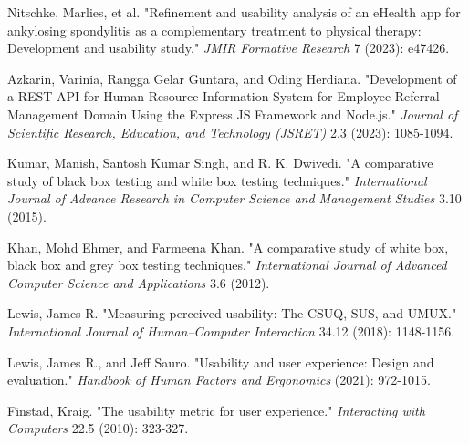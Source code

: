 \documentclass[conference,a4paper]{IEEEtran}
\begin{document}
\begin{thebibliography}{00}
   Nitschke, Marlies, et al. "Refinement and usability analysis of an eHealth app for ankylosing spondylitis as a complementary treatment to physical therapy: Development and usability study." \textit{JMIR Formative Research} 7 (2023): e47426.

   Azkarin, Varinia, Rangga Gelar Guntara, and Oding Herdiana. "Development of a REST API for Human Resource Information System for Employee Referral Management Domain Using the Express JS Framework and Node.js." \textit{Journal of Scientific Research, Education, and Technology (JSRET)} 2.3 (2023): 1085-1094.

   Kumar, Manish, Santosh Kumar Singh, and R. K. Dwivedi. "A comparative study of black box testing and white box testing techniques." \textit{International Journal of Advance Research in Computer Science and Management Studies} 3.10 (2015).

   Khan, Mohd Ehmer, and Farmeena Khan. "A comparative study of white box, black box and grey box testing techniques." \textit{International Journal of Advanced Computer Science and Applications} 3.6 (2012).

   Lewis, James R. "Measuring perceived usability: The CSUQ, SUS, and UMUX." \textit{International Journal of Human–Computer Interaction} 34.12 (2018): 1148-1156.

   Lewis, James R., and Jeff Sauro. "Usability and user experience: Design and evaluation." \textit{Handbook of Human Factors and Ergonomics} (2021): 972-1015.

   Finstad, Kraig. "The usability metric for user experience." \textit{Interacting with Computers} 22.5 (2010): 323-327.

\end{thebibliography}
\end{document}
